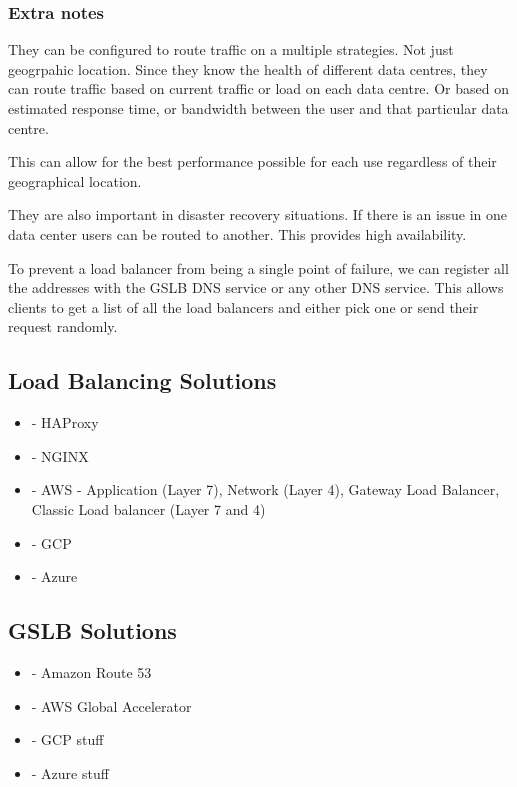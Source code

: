 \documentclass[a4paper, 11pt]{book}
\begin{document}
    \subsubsection{Extra notes}
    They can be configured to route traffic on a multiple strategies.
    Not just geogrpahic location.
    Since they know the health of different data centres, they can route traffic based on current traffic or load on each data centre.
    Or based on estimated response time, or bandwidth between the user and that particular data centre.

    This can allow for the best performance possible for each use regardless of their geographical location.

    They are also important in disaster recovery situations.
    If there is an issue in one data center users can be routed to another.
    This provides high availability.

    To prevent a load balancer from being a single point of failure, we can register all the addresses with the GSLB DNS service or any other DNS service.
    This allows clients to get a list of all the load balancers and either pick one or send their request randomly.

    \subsection{Load Balancing Solutions}
    \begin{itemize}
        \item - HAProxy
        \item - NGINX
        \item - AWS - Application (Layer 7), Network (Layer 4), Gateway Load Balancer, Classic Load balancer (Layer 7 and 4)
        \item - GCP %
        \item - Azure %
    \end{itemize}

    \subsection{GSLB Solutions}
    \begin{itemize}
        \item - Amazon Route 53
        \item - AWS Global Accelerator
        \item - GCP stuff
        \item - Azure stuff
    \end{itemize}
\end{document}
